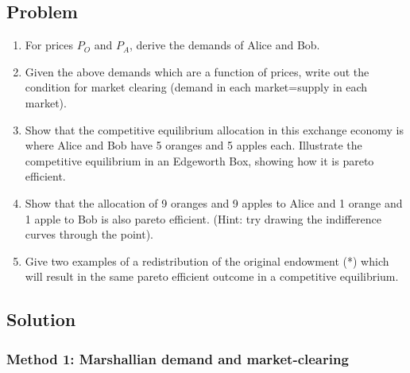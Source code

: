 \documentclass[12pt]{article}
\begin{document}
\subsection{Problem}
\begin{enumerate}[label=(\alph*)]
    \item For prices \(P_O\) and \(P_A\), derive the demands of Alice and Bob.
    \item Given the above demands which are a function of prices, write out the condition for market clearing (demand in each market=supply in each market).
    \item Show that the competitive equilibrium allocation in this exchange economy is where Alice and Bob have 5 oranges and 5 apples each. Illustrate the competitive equilibrium in an Edgeworth Box, showing how it is pareto efficient.
    \item Show that the allocation of 9 oranges and 9 apples to Alice and 1 orange and 1 apple to Bob is also pareto efficient. (Hint: try drawing the indifference curves through the point).
    \item Give two examples of a redistribution of the original endowment (*) which will result in the same pareto efficient outcome in a competitive equilibrium.
\end{enumerate}

\newpage
\subsection{Solution}

\subsubsection{Method 1: Marshallian demand and market-clearing}
\end{document}
